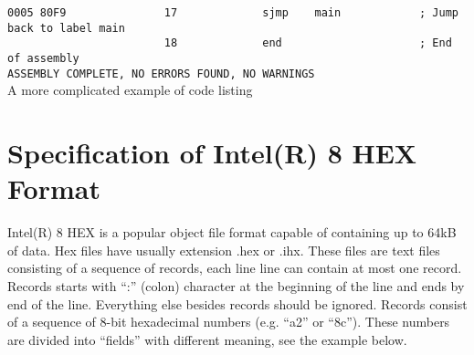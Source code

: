 {\begin{code}[h]
                        {\color{highlight_lst_address}\verb'0005'}{\color{highlight_lst_code}\verb' 80F9'}{\color{highlight_lst_line}\verb'               17'}\verb'             '{\color{highlight_instruction}\verb'sjmp'}\verb'    '{\color{highlight_constant}\verb'main'}\verb'            '{\color{highlight_comment}\verb'; Jump back to label main'}\\
                        {\color{highlight_lst_line}\verb'                        18'}\verb'             '{\color{highlight_directive}\verb'end'}\verb'                     '{\color{highlight_comment}\verb'; End of assembly'}\\
                        {\color{highlight_lst_msg}\verb'ASSEMBLY COMPLETE,'}\verb' NO ERRORS FOUND, NO WARNINGS'\\
                        \caption{A more complicated example of code listing}
                \end{code}

        \section{Specification of Intel(R) 8 HEX Format}
                Intel(R) 8 HEX is a popular object file format capable of containing up to
       64kB of data. Hex files have usually extension .hex or .ihx. These files are text files
       consisting of a sequence of records, each line line can contain at most one record.
       Records starts with ``:'' (colon) character at the beginning of the line and ends by
       end of the line. Everything else besides records should be ignored. Records consist
       of a sequence of 8-bit hexadecimal numbers (e.g. ``a2'' or ``8c''). These numbers are
       divided into ``fields'' with different meaning, see the example below.

}
